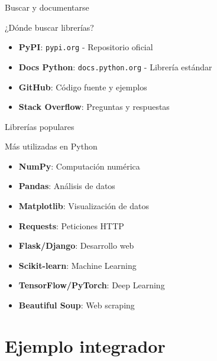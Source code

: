 \documentclass{beamer}
\begin{document}
\begin{frame}{Buscar y documentarse \faSearch}
\begin{conceptbox}{¿Dónde buscar librerías?}
\small
\begin{itemize}
    \item[\faGlobe] \textbf{PyPI}: \texttt{pypi.org} - Repositorio oficial
    \item[\faBook] \textbf{Docs Python}: \texttt{docs.python.org} - Librería estándar
    \item[\faGithub] \textbf{GitHub}: Código fuente y ejemplos
    \item[\faStackOverflow] \textbf{Stack Overflow}: Preguntas y respuestas
\end{itemize}
\end{conceptbox}

\vspace{0.2cm}

\end{frame}

\begin{frame}{Librerías populares \faStar}
\begin{conceptbox}{Más utilizadas en Python}
\small
\begin{itemize}
    \item[\faChartLine] \textbf{NumPy}: Computación numérica
    \item[\faTable] \textbf{Pandas}: Análisis de datos
    \item[\faChartPie] \textbf{Matplotlib}: Visualización de datos
    \item[\faGlobe] \textbf{Requests}: Peticiones HTTP
    \item[\faFlask] \textbf{Flask/Django}: Desarrollo web
    \item[\faRobot] \textbf{Scikit-learn}: Machine Learning
    \item[\faBrain] \textbf{TensorFlow/PyTorch}: Deep Learning
    \item[\faFileAlt] \textbf{Beautiful Soup}: Web scraping
\end{itemize}
\end{conceptbox}
\end{frame}

\section{Ejemplo integrador}
\end{document}
